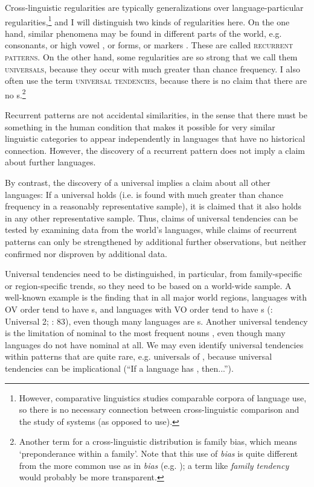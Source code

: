 \documentclass[output=paper]{langsci/langscibook}
\begin{document}
Cross-linguistic regularities are typically generalizations over language-par\-tic\-u\-lar regularities,\footnote{However, comparative  linguistics studies comparable corpora of language use, so there is no necessary connection between cross-linguistic comparison and the study of systems (as opposed to use).} and I will distinguish two kinds of regularities here. On the one hand, similar phenomena may be found in different parts of the world, e.g.  consonants, or high vowel , or   forms, or  markers \citep{Creissels2014}. These are called \textsc{recurrent patterns}. On the other hand, some regularities are so strong that we call them \textsc{universals}, because they occur with much greater than chance frequency. I also often use the term \textsc{universal tendencies}, because there is no claim that there are no s.\footnote{Another term for a cross-linguistic distribution is  family bias, which means ‘preponderance within a family’. Note that this use of \textit{bias} is quite different from the more common use as in \textit{ bias} (e.g. \citealt{TverskyKahneman1974}); a term like \textit{family tendency} would probably be more transparent.}
\largerpage[2]

Recurrent patterns are not accidental similarities, in the sense that there must be something in the human condition that makes it possible for very similar linguistic categories to appear independently in languages that have no historical connection. However, the discovery of a recurrent pattern does not imply a claim about further languages.

By contrast, the discovery of a universal implies a claim about all other languages: If a universal holds (i.e. is found with much greater than chance frequency in a reasonably representative sample), it is claimed that it also holds in any other representative sample. Thus, claims of universal tendencies can be tested by examining data from the world’s languages, while claims of recurrent patterns can only be strengthened by additional further observations, but neither confirmed nor disproven by additional data. 

Universal tendencies need to be distinguished, in particular, from family-spe\-cif\-ic or region-specific trends, so they need to be based on a world-wide sample. A well-known example is the finding that in all major world regions, languages with OV order tend to have s, and languages with VO order tend to have s (\citealt{Greenberg1963}: Universal 2; \citealt{Dryer1992}: 83), even though many languages are s. Another universal tendency is the limitation of nominal  to the most frequent nouns \citep{Vafaeian2013}, even though many languages do not have nominal  at all. We may even identify universal tendencies within patterns that are quite rare, e.g. universals of  \citep{Yu2007}, because universal tendencies can be implicational (“If a language has , then...”).
\end{document}
